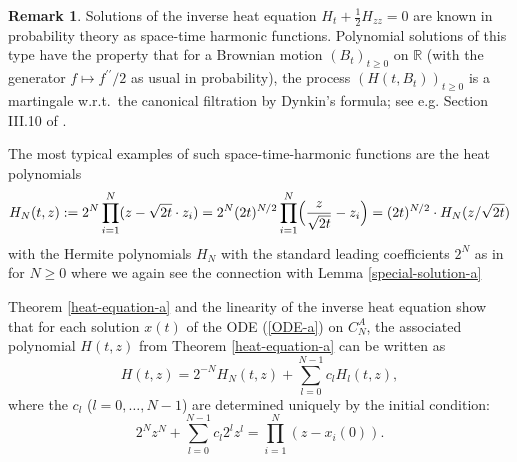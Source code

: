 \documentclass[reqno]{amsart}
\theoremstyle{plain}
\theoremstyle{definition}
\newtheorem{remark}[theorem]{Remark}
\numberwithin{equation}{section}
\begin{document}
\begin{remark}\label{martingale-a}
  Solutions of the inverse heat equation $H_t+ \frac{1}{2}H_{zz}=0$ are known in probability theory as space-time harmonic functions.
   Polynomial solutions of this type have
   the property that for a  Brownian motion $(B_t)_{t\ge0}$ on $\mathbb R$ (with the generator $f\mapsto f^{\prime\prime}/2$
   as usual in probability), the process $(H(t, B_t))_{t\ge0}$ is a martingale w.r.t.~the canonical filtration
   by Dynkin's formula; see e.g. Section III.10 of \cite{RW}.
   
   The most typical examples of such  space-time-harmonic functions are the  heat polynomials
\begin{equation}\label{heat-pol-a}
   H_N(t,z):=2^N\prod_{i=1}^N (z-\sqrt{2t}\cdot z_i)=2^N (2t)^{N/2}\prod_{i=1}^N\Bigl( \frac{z}{\sqrt{2t}}-z_i\Bigr)=
   (2t)^{N/2} \cdot H_N(z/\sqrt{2t})
   \end{equation}
with the Hermite polynomials $H_N$ with the standard leading coefficients $2^N$ as in \cite{S} for $N\ge0$ where we again see the
connection with Lemma \ref{special-solution-a}



   Theorem \ref{heat-equation-a} and the linearity of the inverse heat equation  show
   that for each solution $x(t)$ of the ODE (\ref{ODE-a}) on $C_N^A$, the associated polynomial $H(t,z)$  from Theorem \ref{heat-equation-a}
   can be written  as
$$H(t,z)=2^{-N}H_N(t,z)+\sum_{l=0}^{N-1} c_lH_l(t,z),$$
   where  the $c_l$ ($l=0,\ldots, N-1$) are determined uniquely by the initial condition:
   $$2^Nz^N +\sum_{l=0}^{N-1} c_l 2^l z^l= \prod_{i=1}^N (z-x_i(0)).$$
\end{remark}
\end{document}

